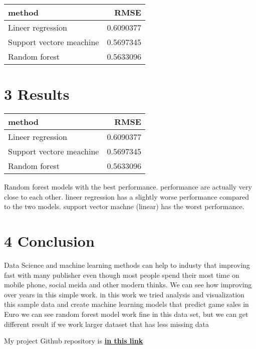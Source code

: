 \documentclass[]{article}
\newenvironment{Shaded}{\begin{snugshade}}{\end{snugshade}}
\newcommand{\KeywordTok}[1]{\textcolor[rgb]{0.13,0.29,0.53}{\textbf{#1}}}
\newcommand{\NormalTok}[1]{#1}
\newcommand{\OperatorTok}[1]{\textcolor[rgb]{0.81,0.36,0.00}{\textbf{#1}}}
\newcommand{\StringTok}[1]{\textcolor[rgb]{0.31,0.60,0.02}{#1}}
\begin{document}
\begin{Shaded}
\end{Shaded}

\begin{longtable}[]{@{}lr@{}}
\toprule
method & RMSE\tabularnewline
\midrule
\endhead
Lineer regression & 0.6090377\tabularnewline
Support vectore meachine & 0.5697345\tabularnewline
Random forest & 0.5633096\tabularnewline
\bottomrule
\end{longtable}

\hypertarget{results}{%
\section{3 Results}\label{results}}

\begin{Shaded}
\end{Shaded}

\begin{longtable}[]{@{}lr@{}}
\toprule
method & RMSE\tabularnewline
\midrule
\endhead
Lineer regression & 0.6090377\tabularnewline
Support vectore meachine & 0.5697345\tabularnewline
Random forest & 0.5633096\tabularnewline
\bottomrule
\end{longtable}

Random forest models with the best performance. performance are actually
very close to each other. lineer regression has a slightly worse
performance compared to the two models. support vector machne (linear)
has the worst performance.

\hypertarget{conclusion}{%
\section{4 Conclusion}\label{conclusion}}

Data Science and machine learning methods can help to industy that
improving fast with many publisher even though most people spend their
most time on mobile phone, social meida and other modern thinks. We can
see how improving over years in this simple work. in this work we tried
analysis and visualization this sample data and create machine learning
models that predict game sales in Euro we can see random forest model
work fine in this data set, but we can get different result if we work
larger dataset that has less missing data

My project Github repository is
\textbf{\href{https://github.com/savasturkoglu1/edx-project}{in this
link}}
\end{document}
